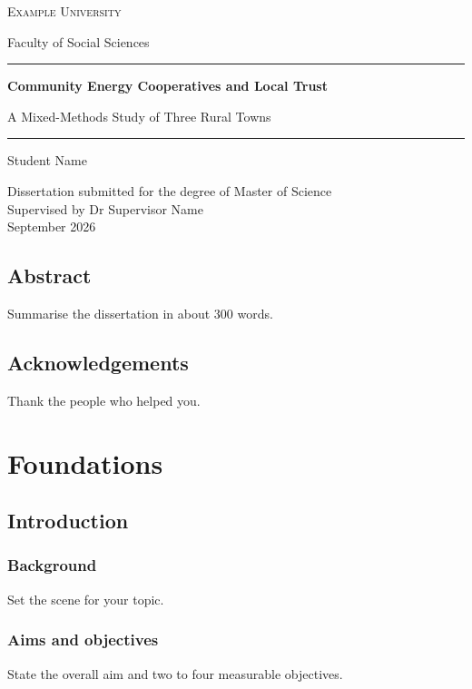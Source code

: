 \documentclass[11pt,a4paper,twoside,openright]{book}
\begin{document}
\frontmatter
\begin{titlepage}
  \centering
  {\scshape Example University\par}
  {\small Faculty of Social Sciences\par}
  \vspace{4cm}
  {\color{partcolor}\rule{\linewidth}{1pt}\par}
  \vspace{0.8em}
  {\Huge\bfseries Community Energy Cooperatives and Local Trust\par}
  \vspace{0.5em}
  {\Large A Mixed-Methods Study of Three Rural Towns\par}
  {\color{partcolor}\rule{\linewidth}{1pt}\par}
  \vfill
  {\large Student Name\par}
  \vspace{0.5em}
  Dissertation submitted for the degree of Master of Science\\
  Supervised by Dr Supervisor Name\\[1em]
  September 2026
\end{titlepage}

\chapter{Abstract}
Summarise the dissertation in about 300 words.

\chapter{Acknowledgements}
Thank the people who helped you.

\tableofcontents
\listoftables

\mainmatter

\part{Foundations}

\chapter{Introduction}
\section{Background}
Set the scene for your topic.
\section{Aims and objectives}
State the overall aim and two to four measurable objectives.
\end{document}
